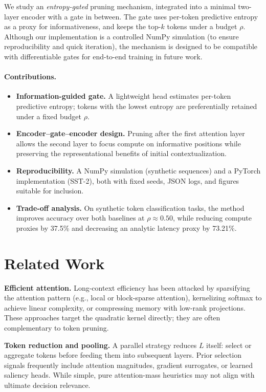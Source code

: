 \documentclass{article}
\newcommand{\keep}{0.50}         %
\newcommand{\flopsred}{37.5\%}   %
\newcommand{\latred}{73.21\%}    %
\begin{document}
We study an \emph{entropy-gated} pruning mechanism, integrated into a minimal two-layer encoder with a gate in between. The gate uses per-token predictive entropy as a proxy for informativeness, and keeps the top-$k$ tokens under a budget $\rho$. Although our implementation is a controlled NumPy simulation (to ensure reproducibility and quick iteration), the mechanism is designed to be compatible with differentiable gates for end-to-end training in future work.

\paragraph{Contributions.}
\begin{itemize}
  \item \textbf{Information-guided gate.} A lightweight head estimates per-token predictive entropy; tokens with the lowest entropy are preferentially retained under a fixed budget $\rho$.
  \item \textbf{Encoder--gate--encoder design.} Pruning after the first attention layer allows the second layer to focus compute on informative positions while preserving the representational benefits of initial contextualization.
  \item \textbf{Reproducibility.} A NumPy simulation (synthetic sequences) and a PyTorch implementation (SST-2), both with fixed seeds, JSON logs, and figures suitable for inclusion.
  \item \textbf{Trade-off analysis.} On synthetic token classification tasks, the method improves accuracy over both baselines at $\rho{\approx}\keep$, while reducing compute proxies by \flopsred{} and decreasing an analytic latency proxy by \latred{}.
\end{itemize}

\section{Related Work}
\label{sec:related}
\textbf{Efficient attention.} Long-context efficiency has been attacked by sparsifying the attention pattern (e.g., local or block-sparse attention), kernelizing softmax to achieve linear complexity, or compressing memory with low-rank projections. These approaches target the quadratic kernel directly; they are often complementary to token pruning.

\textbf{Token reduction and pooling.} A parallel strategy reduces $L$ itself: select or aggregate tokens before feeding them into subsequent layers. Prior selection signals frequently include attention magnitudes, gradient surrogates, or learned saliency heads. While simple, pure attention-mass heuristics may not align with ultimate decision relevance.
\end{document}
